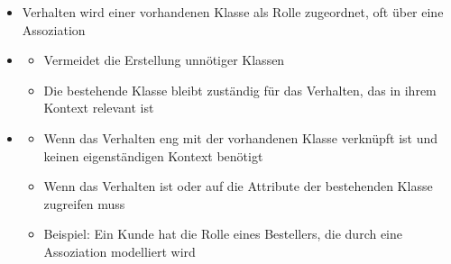 \begin{infoBox}[title=Verhalten als Rolle einer bestehenden Klasse modellieren]
    \begin{itemize}
        \item {} Verhalten wird einer vorhandenen Klasse als Rolle zugeordnet, oft über eine Assoziation
        \item {}
        \begin{itemize}
            \item {} Vermeidet die Erstellung unnötiger Klassen
            \item {} Die bestehende Klasse bleibt zuständig für das Verhalten, das in ihrem Kontext relevant ist
        \end{itemize}
        \item {}
        \begin{itemize}
            \item Wenn das Verhalten eng mit der vorhandenen Klasse verknüpft ist und keinen eigenständigen Kontext benötigt
            \item Wenn das Verhalten  ist oder auf die Attribute der bestehenden Klasse zugreifen muss
            \item Beispiel: Ein Kunde hat die Rolle eines Bestellers, die durch eine Assoziation modelliert wird
        \end{itemize}
    \end{itemize}
\end{infoBox}
